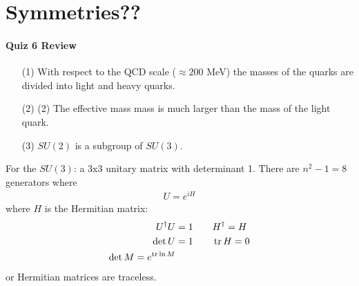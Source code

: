 \documentclass[../main.tex]{subfiles}
\begin{document}
\section*{Symmetries??}

\paragraph{Quiz 6 Review}
\begin{itemize}
    \item [(1)] With respect to the QCD scale ($\approx 200$ MeV) the masses of the quarks are
    divided into light and heavy quarks.
    \item [(2)] (2) The effective mass mass is much larger than the mass of the light quark.
    \item [(3)] $SU(2)$ is a subgroup of $SU(3)$.
\end{itemize}

For the $SU(3)$: a 3x3 unitary matrix with determinant 1. There are $n^2 - 1 = 8$ generators where
\begin{align*}
    U = e^{iH}
\end{align*}
where $H$ is the Hermitian matrix:
\begin{align*}
    U^\dagger U &= 1 \qquad H^\dagger = H \\
    \det U &= 1 \qquad \trace H = 0 \\
    \det M = e^{\trace \ln M}
\end{align*}
or Hermitian matrices are traceless. 
\end{document}
